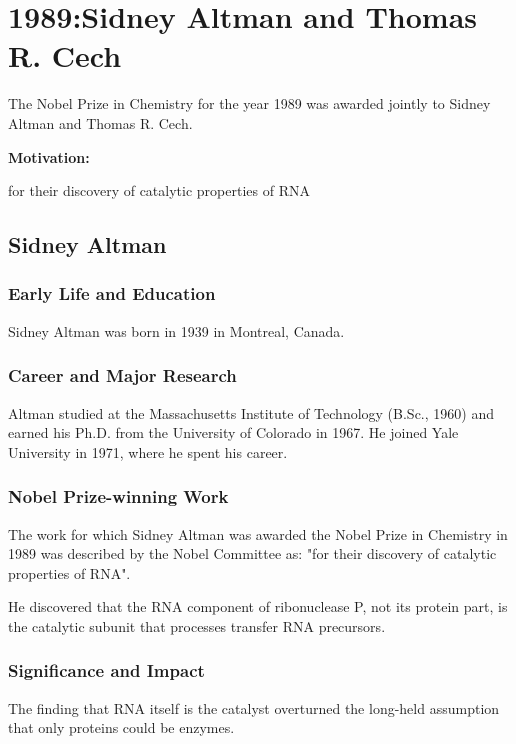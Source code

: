 \chapter{1989:Sidney Altman and Thomas R. Cech}

\label{chap:chemistry1989}

The Nobel Prize in Chemistry for the year 1989 was awarded jointly to Sidney Altman and Thomas R. Cech.

\textbf{Motivation:}

for their discovery of catalytic properties of RNA

\section{Sidney Altman}

\subsection*{Early Life and Education}

Sidney Altman was born in 1939 in Montreal, Canada.

\subsection*{Career and Major Research}

Altman studied at the Massachusetts Institute of Technology (B.Sc., 1960) and earned his Ph.D. from the University of Colorado in 1967. He joined Yale University in 1971, where he spent his career.

\subsection*{Nobel Prize-winning Work}

The work for which Sidney Altman was awarded the Nobel Prize in Chemistry in 1989 was described by the Nobel Committee as: "for their discovery of catalytic properties of RNA".

He discovered that the RNA component of ribonuclease P, not its protein part, is the catalytic subunit that processes transfer RNA precursors.

\subsection*{Significance and Impact}

The finding that RNA itself is the catalyst overturned the long-held assumption that only proteins could be enzymes.

